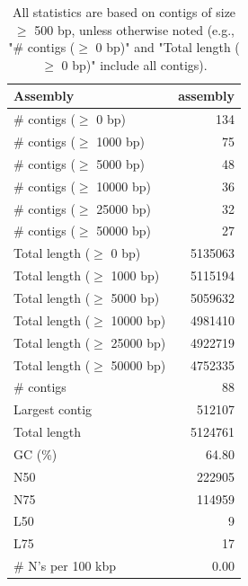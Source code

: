 \documentclass[12pt,a4paper]{article}
\begin{document}
\begin{table}[ht]
\begin{center}
\caption{All statistics are based on contigs of size $\geq$ 500 bp, unless otherwise noted (e.g., "\# contigs ($\geq$ 0 bp)" and "Total length ($\geq$ 0 bp)" include all contigs).}
\begin{tabular}{|l*{1}{|r}|}
\hline
Assembly & assembly \\ \hline
\# contigs ($\geq$ 0 bp) & 134 \\ \hline
\# contigs ($\geq$ 1000 bp) & 75 \\ \hline
\# contigs ($\geq$ 5000 bp) & 48 \\ \hline
\# contigs ($\geq$ 10000 bp) & 36 \\ \hline
\# contigs ($\geq$ 25000 bp) & 32 \\ \hline
\# contigs ($\geq$ 50000 bp) & 27 \\ \hline
Total length ($\geq$ 0 bp) & 5135063 \\ \hline
Total length ($\geq$ 1000 bp) & 5115194 \\ \hline
Total length ($\geq$ 5000 bp) & 5059632 \\ \hline
Total length ($\geq$ 10000 bp) & 4981410 \\ \hline
Total length ($\geq$ 25000 bp) & 4922719 \\ \hline
Total length ($\geq$ 50000 bp) & 4752335 \\ \hline
\# contigs & 88 \\ \hline
Largest contig & 512107 \\ \hline
Total length & 5124761 \\ \hline
GC (\%) & 64.80 \\ \hline
N50 & 222905 \\ \hline
N75 & 114959 \\ \hline
L50 & 9 \\ \hline
L75 & 17 \\ \hline
\# N's per 100 kbp & 0.00 \\ \hline
\end{tabular}
\end{center}
\end{table}
\end{document}
